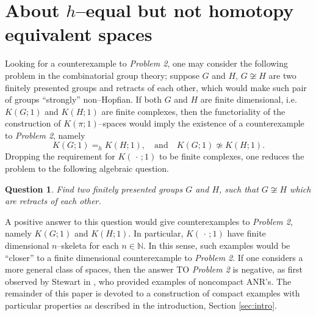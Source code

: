 \documentclass[reqno,12pt]{amsart}
\newtheorem{question}[theorem]{Question}
\theoremstyle{ourremark}
\numberwithin{equation}{section}
\numberwithin{theorem}{section}
\begin{document}
\section{About \texorpdfstring{$h$}{h}--equal but not homotopy equivalent spaces}\label{sec:continua}
Looking for a counterexample to {\em Problem 2}, one may consider the following problem in the combinatorial group theory;  suppose $G$ and $H$, $G\not\cong H$ are two finitely presented groups and retracts of each other, which would make such pair of groups ``strongly'' non--Hopfian.
If both $G$ and $H$ are finite dimensional, i.e. $K(G;1)$ and $K(H;1)$ are finite complexes, then the functoriality of the construction of $K(\pi;1)$--spaces would imply the existence of a counterexample to {\em Problem 2}, namely
\[
 K(G;1)=_h K(H;1),\quad \text{and}\quad K(G;1)\not\simeq K(H;1).
\]
{\noindent} Dropping the requirement for $K(\,\cdot\,;1)$ to be finite complexes, one reduces the problem to the following algebraic question. 
\begin{question}
Find two finitely presented groups  $G$ and $H$, such that $G\not\cong H$ which are retracts of each other.
\end{question}
{\noindent} A positive answer to this question would give counterexamples to {\em Problem 2}, namely $K(G;1)$ and $K(H;1)$. In particular, $K(\,\cdot\,;1)$ have finite dimensional $n$--skeleta for each $n\in \mathbb{N}$. In this sense, such examples would be ``closer'' to a finite dimensional counterexample to {\em Problem 2}.
If one considers a more general class of spaces,  then the answer TO {\em Problem 2} is negative, as first observed by Stewart in \cite{Stewart58}, who provided examples of noncompact ANR's. The remainder of this paper is devoted to a construction of compact examples with particular properties as described in the introduction, Section \ref{sec:intro}.
\end{document}

